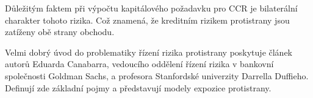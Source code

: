 \documentclass[a4paper,12pt]{report}
\theoremstyle{definition} \newtheorem{definice}[veta]{Definice}
\theoremstyle{remark}
\begin{document}
Důležitým faktem při výpočtu kapitálového požadavku pro CCR je  bilaterální charakter tohoto rizika. Což znamená, že kreditním rizikem protistrany jsou zatíženy obě strany obchodu.

Velmi dobrý úvod do problematiky řízení rizika protistrany poskytuje článek \cite{canabarro2003measuring} autorů Eduarda Canabarra, vedoucího oddělení řízení rizika v bankovní společnosti Goldman Sachs, a profesora Stanfordské univerzity Darrella Duffieho.
Definují zde základní pojmy a představují modely expozice protistrany.




\end{document}
